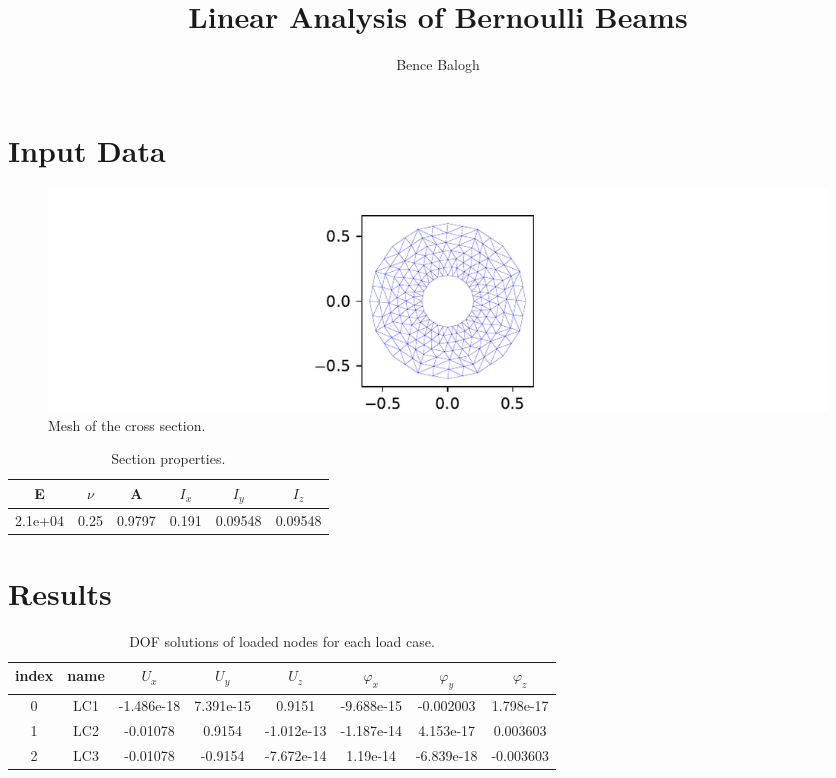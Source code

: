 \documentclass{article}%
\title{Linear Analysis of Bernoulli Beams}%
\author{Bence Balogh}%
\date{}%
\begin{document}
%
\normalsize%
\maketitle%
\hrulefill%
\renewcommand{\arraystretch}{1.2}%
\setlength{\tabcolsep}{6pt}%
\section{Input Data}%
\label{sec:InputData}%


\begin{figure}[h!]%
\centering%
\includegraphics[width=\textwidth]{cross section.pdf}%
\caption{Mesh of the cross section.}%
\end{figure}

%
\begin{table}[h!]\centering%
\begin{tabular}{| c c | c c c c |}%
\hline%
E&$\nu$&A&$I_x$&$I_y$&$I_z$\\%
\hline%
\hline%
2.1e+04&0.25&0.9797&0.191&0.09548&0.09548\\%
\hline%
\end{tabular}%
\caption{Section properties.}\label{table:tbl-section}\end{table}%
\newpage

%
\section{Results}%
\label{sec:Results}%
\begin{table}[h!]\centering%
\begin{tabular}{| c c | c c c c c c |}%
\hline%
index&name&$U_x$&$U_y$&$U_z$&$\varphi_x$&$\varphi_y$&$\varphi_z$\\%
\hline%
\hline%
0&LC1&{-}1.486e{-}18&7.391e{-}15&0.9151&{-}9.688e{-}15&{-}0.002003&1.798e{-}17\\%
1&LC2&{-}0.01078&0.9154&{-}1.012e{-}13&{-}1.187e{-}14&4.153e{-}17&0.003603\\%
2&LC3&{-}0.01078&{-}0.9154&{-}7.672e{-}14&1.19e{-}14&{-}6.839e{-}18&{-}0.003603\\%
\hline%
\end{tabular}%
\caption{DOF solutions of loaded nodes for each load case.}\label{table:tbl-dofsol}\end{table}%
\end{document}
